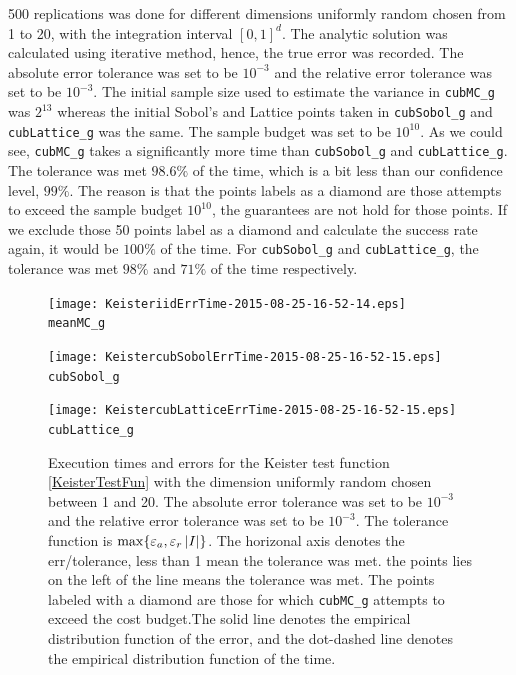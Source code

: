 \documentclass{iitthesis}
\theoremstyle{definition}
\begin{document}
500 replications was done for different dimensions uniformly random chosen from 1 to 20, with the integration interval $[0,1]^d$. The analytic solution was calculated using iterative method, hence, the true error was recorded. The absolute error tolerance was set to be $10^{-3}$ and the relative error tolerance was set to be $10^{-3}$. The initial sample size used to estimate the variance in {\tt cubMC\_g} was $2^{13}$ whereas the initial Sobol's and Lattice points taken in {\tt cubSobol\_g} and {\tt cubLattice\_g} was the same. The sample budget was set to be $10^{10}$. As we could see,  {\tt cubMC\_g} takes a significantly more time than {\tt cubSobol\_g} and {\tt cubLattice\_g}. The tolerance was met $98.6\%$ of the time, which is a bit less than our confidence level, $99\%$. The reason is that the points labels as a diamond are those attempts to exceed the sample budget $10^{10}$,  the guarantees are not hold for those points. If we exclude those 50 points label as a diamond and calculate the success rate again, it would be $100\%$ of the time. For {\tt cubSobol\_g} and {\tt cubLattice\_g}, the tolerance was met $98\%$ and $71\%$ of the time respectively. 

\begin{figure}
\centering
\begin{minipage}{9cm} \centering \texttt{[image: KeisteriidErrTime-2015-08-25-16-52-14.eps]} \\ {\tt meanMC\_g}  \end{minipage}
\begin{minipage}{7cm} \centering \texttt{[image: KeistercubSobolErrTime-2015-08-25-16-52-15.eps]} \\  {\tt cubSobol\_g}\end{minipage}
\begin{minipage}{7cm} \centering \texttt{[image: KeistercubLatticeErrTime-2015-08-25-16-52-15.eps]} \\ {\tt cubLattice\_g} \end{minipage}
\caption{Execution times and errors for the Keister test function \eqref{KeisterTestFun} with the dimension uniformly random chosen between 1 and 20. The absolute error tolerance was set to be $10^{-3}$ and the relative error tolerance was set to be $10^{-3}$.  The tolerance function is $\max\{\varepsilon_a,\varepsilon_r \left \lvert I \right \rvert\}$. The horizonal axis denotes the err/tolerance, less than 1 mean the tolerance was met. the points lies on the left of the line means the tolerance was met. The points labeled with a diamond are those for which  {\tt cubMC\_g}  attempts to exceed the cost budget.The solid line denotes the empirical distribution function of the error, and the dot-dashed line denotes the empirical distribution function of the time.\label{fig:KeisterTestFun} }
\end{figure}
\end{document}
